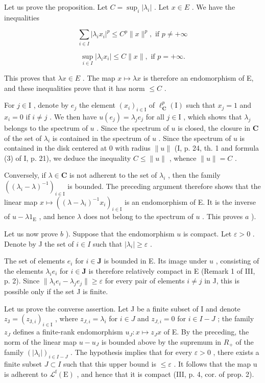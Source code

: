 Let us prove the proposition. Let \(C = \sup_{i} |\lambda_{i}|\) . Let \(x \in E\) . We have the inequalities

\[
\sum_ {i \in I} | \lambda_ {i} x _ {i} | ^ {p} \leqslant C ^ {p} \| x \| ^ {p}, \text {   if   } p \neq + \infty
\]

\[
\sup _ {i \in I} | \lambda_ {i} x _ {i} | \leqslant C \| x \|, \text {   if   } p = + \infty .
\]

This proves that \(\lambda x \in E\) . The map \(x \mapsto \lambda x\) is therefore an endomorphism of E, and these inequalities prove that it has norm \(\leqslant C\) .

For \(j \in \mathrm{I}\) , denote by \(e_j\) the element \((x_i)_{i \in \mathrm{I}}\) of \(\ell_{\mathbf{C}}^p(\mathrm{I})\) such that \(x_j = 1\) and \(x_i = 0\) if \(i \neq j\) . We then have \(u(e_j) = \lambda_j e_j\) for all \(j \in \mathrm{I}\) , which shows that \(\lambda_j\) belongs to the spectrum of \(u\) . Since the spectrum of \(u\) is closed, the closure in \(\mathbf{C}\) of the set of \(\lambda_i\) is contained in the spectrum of \(u\) . Since the spectrum of \(u\) is contained in the disk centered at 0 with radius \(\|u\|\) (I, p. 24, th. 1 and formula (3) of I, p. 21), we deduce the inequality \(C \leqslant \|u\|\) , whence \(\|u\| = C\) .

Conversely, if \(\lambda \in \mathbf{C}\) is not adherent to the set of \(\lambda_{i}\) , then the family \(((\lambda_{i} - \lambda)^{-1})_{i\in \mathrm{I}}\) is bounded. The preceding argument therefore shows that the linear map \(x\mapsto ((\lambda -\lambda_i)^{-1}x_i)_{i\in \mathrm{I}}\) is an endomorphism of E. It is the inverse of \(u - \lambda 1_{\mathrm{E}}\) , and hence \(\lambda\) does not belong to the spectrum of \(u\) . This proves \(a\) ).

Let us now prove \(b\) ). Suppose that the endomorphism \(u\) is compact. Let \(\varepsilon > 0\) . Denote by J the set of \(i \in I\) such that \(|\lambda_i| \geqslant \varepsilon\) .

The set of elements \(e_i\) for \(i \in \mathbf{J}\) is bounded in E. Its image under \(u\) , consisting of the elements \(\lambda_i e_i\) for \(i \in \mathbf{J}\) is therefore relatively compact in E (Remark 1 of III, p. 2). Since \(\| \lambda_i e_i - \lambda_j e_j \| \geqslant \varepsilon\) for every pair of elements \(i \neq j\) in J, this is possible only if the set J is finite.

Let us prove the converse assertion. Let J be a finite subset of I and denote \(z_{\mathrm{J}} = (z_{\mathrm{J},i})_{i \in \mathrm{I}}\) , where \(z_{J,i} = \lambda_i\) for \(i \in J\) and \(z_{J,i} = 0\) for \(i \in I - J\) ; the family \(z_J\) defines a finite-rank endomorphism \(u_J \colon x \mapsto z_J x\) of E. By the preceding, the norm of the linear map \(u - u_J\) is bounded above by the supremum in \(R_+\) of the family \((|\lambda_i|)_{i \in I-J}\) . The hypothesis implies that for every \(\varepsilon > 0\) , there exists a finite subset \(J \subset I\) such that this upper bound is \(\leqslant \varepsilon\) . It follows that the map u is adherent to \(\mathcal{L}^{\mathrm{f}}(\mathrm{E})\) , and hence that it is compact (III, p. 4, cor. of prop. 2).

